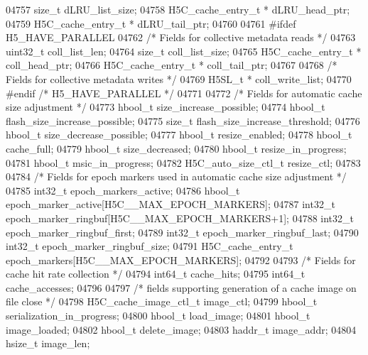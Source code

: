 \begin{DoxyCode}
04757     \textcolor{keywordtype}{size\_t}                      dLRU\_list\_size;
04758     H5C\_cache\_entry\_t *     dLRU\_head\_ptr;
04759     H5C\_cache\_entry\_t *         dLRU\_tail\_ptr;
04760 
04761 \textcolor{preprocessor}{#ifdef H5\_HAVE\_PARALLEL}
04762     \textcolor{comment}{/* Fields for collective metadata reads */}
04763     uint32\_t                    coll\_list\_len;
04764     \textcolor{keywordtype}{size\_t}                      coll\_list\_size;
04765     H5C\_cache\_entry\_t *     coll\_head\_ptr;
04766     H5C\_cache\_entry\_t *     coll\_tail\_ptr;
04767 
04768     \textcolor{comment}{/* Fields for collective metadata writes */}
04769     H5SL\_t *                    coll\_write\_list;
04770 \textcolor{preprocessor}{#endif }\textcolor{comment}{/* H5\_HAVE\_PARALLEL */}\textcolor{preprocessor}{}
04771 
04772     \textcolor{comment}{/* Fields for automatic cache size adjustment */}
04773     hbool\_t         size\_increase\_possible;
04774     hbool\_t         flash\_size\_increase\_possible;
04775     \textcolor{keywordtype}{size\_t}          flash\_size\_increase\_threshold;
04776     hbool\_t         size\_decrease\_possible;
04777     hbool\_t         resize\_enabled;
04778     hbool\_t         cache\_full;
04779     hbool\_t         size\_decreased;
04780     hbool\_t         resize\_in\_progress;
04781     hbool\_t         msic\_in\_progress;
04782     H5C\_auto\_size\_ctl\_t     resize\_ctl;
04783 
04784     \textcolor{comment}{/* Fields for epoch markers used in automatic cache size adjustment */}
04785     int32\_t         epoch\_markers\_active;
04786     hbool\_t         epoch\_marker\_active[H5C\_\_MAX\_EPOCH\_MARKERS];
04787     int32\_t         epoch\_marker\_ringbuf[H5C\_\_MAX\_EPOCH\_MARKERS+1];
04788     int32\_t         epoch\_marker\_ringbuf\_first;
04789     int32\_t         epoch\_marker\_ringbuf\_last;
04790     int32\_t         epoch\_marker\_ringbuf\_size;
04791     H5C\_cache\_entry\_t       epoch\_markers[H5C\_\_MAX\_EPOCH\_MARKERS];
04792 
04793     \textcolor{comment}{/* Fields for cache hit rate collection */}
04794     int64\_t         cache\_hits;
04795     int64\_t         cache\_accesses;
04796 
04797     \textcolor{comment}{/* fields supporting generation of a cache image on file close */}
04798     H5C\_cache\_image\_ctl\_t   image\_ctl;
04799     hbool\_t         serialization\_in\_progress;
04800     hbool\_t         load\_image;
04801     hbool\_t                     image\_loaded;
04802     hbool\_t         delete\_image;
04803     haddr\_t             image\_addr;
04804     hsize\_t         image\_len;

\end{DoxyCode}

